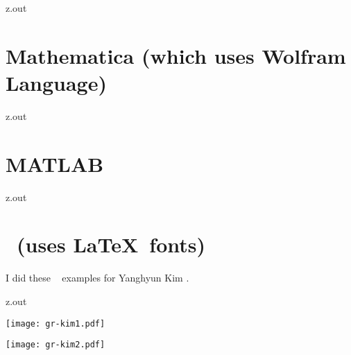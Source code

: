 \MyIO



\begin{VerbatimOut}{z.out}

\section{Mathematica (which uses Wolfram Language)}
\end{VerbatimOut}

\MyIO


\begin{VerbatimOut}{z.out}

\section{MATLAB}
\end{VerbatimOut}

\MyIO


\begin{VerbatimOut}{z.out}

\section{\protect\METAPOSTLogo\ (uses \LaTeX\ fonts)}

I did these \METAPOSTLogo\ \cite{metapost} examples
for Yanghyun Kim \cite{kim2009}.
\end{VerbatimOut}

\MyIO


\begin{VerbatimOut}{z.out}

\texttt{[image: gr-kim1.pdf]}

\vspace{0.1truein}

\texttt{[image: gr-kim2.pdf]}
\end{VerbatimOut}

\MyIO


